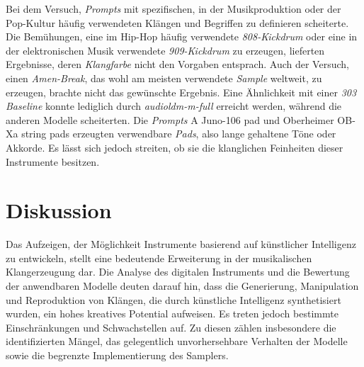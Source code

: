 \documentclass[
  a4paper,  %
  twoside,  %
  bibliography=totoc,
  headsepline,
  cleardoublepage=empty,
  parskip=half,
  draft=false
]{scrbook}
\begin{document}
{Bei dem Versuch, \emph{Prompts} mit spezifischen, in der Musikproduktion oder der Pop-Kultur häufig verwendeten Klängen und Begriffen zu definieren scheiterte. Die Bemühungen, eine im Hip-Hop häufig verwendete \emph{808-Kickdrum} oder eine in der elektronischen Musik verwendete \emph{909-Kickdrum} zu erzeugen, lieferten Ergebnisse, deren \emph{Klangfarbe} nicht den Vorgaben entsprach. Auch der Versuch, einen \emph{Amen-Break}, das wohl am meisten verwendete \emph{Sample} weltweit, zu erzeugen, brachte nicht das gewünschte Ergebnis. Eine Ähnlichkeit mit einer \emph{303 Baseline} konnte lediglich durch \emph{audioldm-m-full} erreicht werden, während die anderen Modelle scheiterten. Die \emph{Prompts} \glqq A Juno-106 pad\grqq{} und \glqq Oberheimer OB-Xa string pads\grqq{} erzeugten verwendbare \emph{Pads}, also lange gehaltene Töne oder Akkorde. Es lässt sich jedoch streiten, ob sie die klanglichen Feinheiten dieser Instrumente besitzen. 

\chapter{Diskussion}
Das Aufzeigen, der Möglichkeit Instrumente basierend auf künstlicher Intelligenz zu entwickeln, stellt eine bedeutende Erweiterung in der musikalischen Klangerzeugung dar. Die Analyse des digitalen Instruments und die Bewertung der anwendbaren Modelle deuten darauf hin, dass die Generierung, Manipulation und Reproduktion von Klängen, die durch künstliche Intelligenz synthetisiert wurden, ein hohes kreatives Potential aufweisen. Es treten jedoch bestimmte Einschränkungen und Schwachstellen auf. Zu diesen zählen insbesondere die identifizierten Mängel, das gelegentlich unvorhersehbare Verhalten der Modelle sowie die begrenzte Implementierung des Samplers.

}
\end{document}
